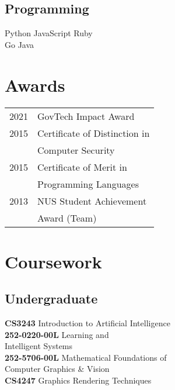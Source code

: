 \documentclass[]{deedy-resume-openfont}
\begin{document}
\begin{minipage}[t]{0.25\textwidth}
\subsection{Programming}
Python \textbullet{}  JavaScript \textbullet{} Ruby \\
Go \textbullet{}  Java \\
\sectionsep


\section{Awards}
\begin{tabular}{rl}
2021 &GovTech Impact Award\\
2015	 &Certificate of Distinction in \\ & Computer Security\\
2015	 &Certificate of Merit in \\ &Programming Languages\\
2013	 & NUS Student Achievement\\ &Award (Team)
\end{tabular}
\sectionsep





\section{Coursework}

\subsection{Undergraduate}
\textbf{CS3243} Introduction to Artificial Intelligence \\
\textbf{252-0220-00L} Learning and \\
Intelligent Systems \\
\textbf{252-5706-00L} Mathematical Foundations of \\
Computer Graphics \& Vision \\
\textbf{CS4247} Graphics Rendering Techniques \\


\end{minipage}
\end{document}
